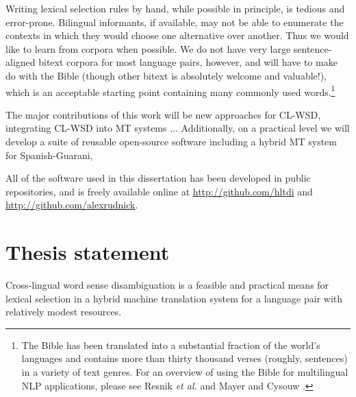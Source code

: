 





Writing lexical selection rules by hand, while possible in principle, is
tedious and error-prone.
Bilingual informants, if available, may not be able to enumerate the contexts
in which they would choose one alternative over another. Thus we would like to
learn from corpora when possible.
We do not have very large sentence-aligned bitext corpora for most language
pairs, however, and will have to make do with the Bible (though other bitext is
absolutely welcome and valuable!), which is an acceptable
starting point containing many commonly used words.\footnote{The
Bible has been translated into a substantial fraction of the world's languages
and contains more than thirty thousand verses (roughly, sentences) in
a variety of text genres. For an overview of using the Bible for multilingual
NLP applications, please see Resnik \emph{et al.}
\cite{DBLP:journals/lre/ResnikOD99} and Mayer and Cysouw
\cite{MAYER14.220.L14-1215}.}


The major contributions of this work will be new approaches for CL-WSD,
integrating CL-WSD into MT systems ...
Additionally, on a practical level we will develop a suite of reusable
open-source software including a hybrid MT system for Spanish-Guarani,

All of the software used in this dissertation has been developed in public
repositories, and is freely available online at
\url{http://github.com/hltdi} and \url{http://github.com/alexrudnick}.

\section{Thesis statement}
Cross-lingual word sense disambiguation is a feasible and practical
means for lexical selection in a hybrid machine translation system for a
language pair with relatively modest resources.

